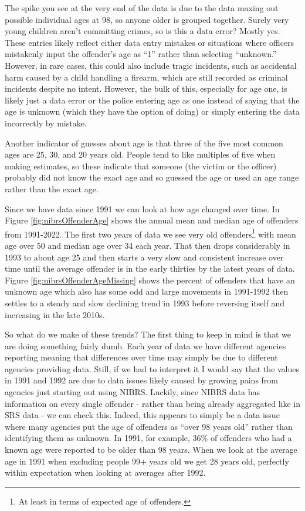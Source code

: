 \documentclass[
]{krantz}
\begin{document}
The spike you see at the very end of the data is due to the
data maxing out possible individual ages at 98, so anyone
older is grouped together. Surely very young children aren't
committing crimes, so is this a data error? Mostly yes.
These entries likely reflect either data entry mistakes or
situations where officers mistakenly input the offender's
age as ``1'' rather than selecting ``unknown.'' However, in
rare cases, this could also include tragic incidents, such
as accidental harm caused by a child handling a firearm,
which are still recorded as criminal incidents despite no
intent. However, the bulk of this, especially for age one,
is likely just a data error or the police entering age as
one instead of saying that the age is unknown (which they
have the option of doing) or simply entering the data
incorrectly by mistake.

Another indicator of guesses about age is that three of the
five most common ages are 25, 30, and 20 years old. People
tend to like multiples of five when making estimates, so
these indicate that someone (the victim or the officer)
probably did not know the exact age and so guessed the age
or used an age range rather than the exact age.

Since we have data since 1991 we can look at how age changed
over time. In Figure \ref{fig:nibrsOffenderAge} shows the
annual mean and median age of offenders from 1991-2022. The
first two years of data we see very old offenders\footnote{At
  least in terms of expected age of offenders.} with mean
age over 50 and median age over 34 each year. That then
drops considerably in 1993 to about age 25 and then starts a
very slow and consistent increase over time until the
average offender is in the early thirties by the latest
years of data. Figure \ref{fig:nibrsOffenderAgeMissing}
shows the percent of offenders that have an unknown age
which also has some odd and large movements in 1991-1992
then settles to a steady and slow declining trend in 1993
before reversing itself and increasing in the late 2010s.

So what do we make of these trends? The first thing to keep
in mind is that we are doing something fairly dumb. Each
year of data we have different agencies reporting meaning
that differences over time may simply be due to different
agencies providing data. Still, if we had to interpret it I
would say that the values in 1991 and 1992 are due to data
issues likely caused by growing pains from agencies just
starting out using NIBRS. Luckily, since NIBRS data has
information on every single offender - rather than being
already aggregated like in SRS data - we can check this.
Indeed, this appears to simply be a data issue where many
agencies put the age of offenders as ``over 98 years old''
rather than identifying them as unknown. In 1991, for
example, 36\% of offenders who had a known age were reported
to be older than 98 years. When we look at the average age
in 1991 when excluding people 99+ years old we get 28 years
old, perfectly within expectation when looking at averages
after 1992.
\end{document}
